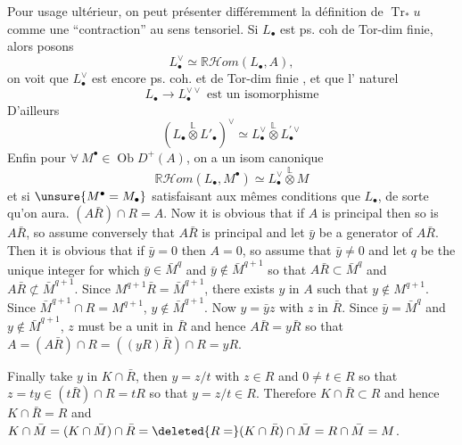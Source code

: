 Pour usage ultérieur, on peut présenter différemment la définition de $\operatorname{Tr}_*u$ comme une ``contraction'' au sens tensoriel. Si $L_\bullet$ est ps. coh de Tor-dim finie, alors posons
\[
L_\bullet^\vee\simeq\mathbb R\mathcal Hom(L_\bullet,A),
\]
on voit que $L_\bullet^\vee$ est encore ps. coh. et de Tor-dim finie , et que l'  naturel
\[
\boxed{L_\bullet\longrightarrow L_\bullet^{\vee\vee}\text{ est un isomorphisme}}
\]
D'ailleurs
\[
\boxed{(L_\bullet\overset{\mathbb L}{\otimes}L'_\bullet)^\vee\simeq L_\bullet^\vee\overset{\mathbb L}{\otimes}L_\bullet^{\prime\vee}}
\]
Enfin pour $\forall\ M^\bullet\in\operatorname{Ob}D^+(A)$, on a un isom canonique
\[
\boxed{\mathbb R\mathcal Hom(L_\bullet,M^\bullet)\simeq L_\bullet^\vee\overset{\mathbb L}{\otimes}M}
\]
et si $\unsure{M^\bullet=M_\bullet}$ satisfaisant aux mêmes conditions que $L_\bullet$, de sorte qu'on aura.
$(A\bar R)\cap R=A$. Now it is obvious that if $A$ is principal then so is $A\bar R$, so assume conversely that $A\bar R$ is principal and let $\bar y$ be a generator of $A\bar R$. Then it is obvious that if $\bar y=0$ then $A=0$, so assume that $\bar y\ne0$ and let $q$ be the unique integer for which $\bar y\in\bar M^q$ and $\bar y\notin\bar M^{q+1}$ so that $A\bar R\subset\bar M^q$ and $A\bar R\not\subset\bar M^{q+1}$. Since $M^{q+1}\bar R=\bar M^{q+1}$, there exists $y$ in $A$ such that $y\notin M^{q+1}$. Since $\bar M^{q+1}\cap R=M^{q+1}$, $y\notin\bar M^{q+1}$. Now $y=\bar yz$ with $z$ in $\bar R$. Since $\bar y=\bar M^q$ and $y\notin\bar M^{q+1}$, $z$ must be a unit in $\bar R$ and hence $A\bar R=y\bar R$ so that $A=(A\bar R)\cap R=((yR)\bar R)\cap R=yR$.

Finally take $y$ in $K\cap\bar R$, then $y=z/t$ with $z\in R$ and $0\ne t\in R$ so that $z=ty\in(t\bar R)\cap R=tR$ so that $y=z/t\in R$. Therefore $K\cap\bar R\subset R$ and hence $K\cap\bar R=R$ and $K\cap\bar M=(K\cap\bar M)\cap\bar R=\deleted{R=}(K\cap\bar R)\cap\bar M=R\cap\bar M=M$.

